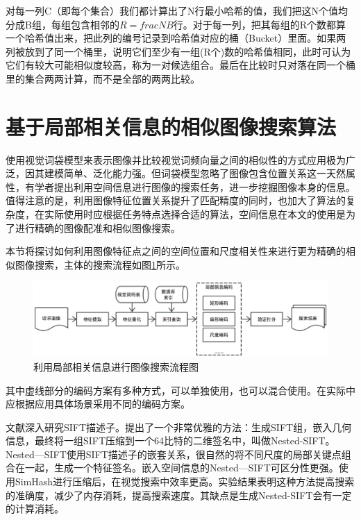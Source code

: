 对每一列C（即每个集合）我们都计算出了N行最小哈希的值，我们把这N个值均分成B组，每组包含相邻的\(R=frac{N}{B}\)行。对于每一列，把其每组的R个数都算一个哈希值出来，把此列的编号记录到哈希值对应的桶（Bucket）里面。如果两列被放到了同一个桶里，说明它们至少有一组(R个)数的哈希值相同，此时可认为它们有较大可能相似度较高，称为一对候选组合。最后在比较时只对落在同一个桶里的集合两两计算，而不是全部的两两比较。


\section{基于局部相关信息的相似图像搜索算法}

使用视觉词袋模型来表示图像并比较视觉词频向量之间的相似性的方式应用极为广泛，因其建模简单、泛化能力强。但词袋模型忽略了图像包含位置关系这一天然属性，有学者提出利用空间信息进行图像的搜索任务，进一步挖掘图像本身的信息\cite{Philbin:2007fk,Wu:2009bl,Zhou:2010tv,Zhou:2013jz,Xu:2013wc}。值得注意的是，利用图像特征位置关系提升了匹配精度的同时，也加大了算法的复杂度，在实际使用时应根据任务特点选择合适的算法，空间信息在本文的使用是为了进行精确的图像配准和相似图像搜索。

本节将探讨如何利用图像特征点之间的空间位置和尺度相关性来进行更为精确的相似图像搜索，主体的搜索流程如图\ref{fig:similar_flowchar}所示。

\begin{figure}
\centering\includegraphics[width=16cm]{imgs/ch3/similar_flowchart}
\caption{利用局部相关信息进行图像搜索流程图}
\label{fig:similar_flowchar}
\end{figure}

其中虚线部分的编码方案有多种方式，可以单独使用，也可以混合使用。在实际中应根据应用具体场景采用不同的编码方案。

文献\cite{Xu:2013wc}深入研究SIFT描述子。提出了一个非常优雅的方法：生成SIFT组，嵌入几何信息，最终将一组SIFT压缩到一个64比特的二维签名中，叫做Nested-SIFT。Nested—SIFT使用SIFT描述子的嵌套关系，很自然的将不同尺度的局部关键点组合在一起，生成一个特征签名。嵌入空间信息的Nested—SIFT可区分性更强。使用SimHash进行压缩后，在视觉搜索中效率更高。实验结果表明这种方法提高搜索的准确度，减少了内存消耗，提高搜索速度。其缺点是生成Nested-SIFT会有一定的计算消耗。


